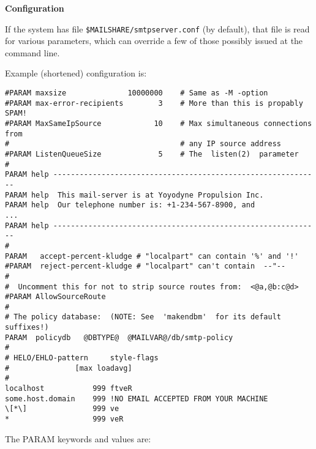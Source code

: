 {\bf Configuration}

If the system has file  {\tt \$MAILSHARE/smtpserver.conf} (by default),
that file is read for various parameters, which can override a few
of those possibly issued at the command line.

Example (shortened) configuration is:

\begin{tscreen}
\begin{verbatim}
#PARAM maxsize              10000000    # Same as -M -option
#PARAM max-error-recipients        3    # More than this is propably SPAM!
#PARAM MaxSameIpSource            10    # Max simultaneous connections from
#                                       # any IP source address
#PARAM ListenQueueSize             5    # The  listen(2)  parameter
#
PARAM help -------------------------------------------------------------
PARAM help  This mail-server is at Yoyodyne Propulsion Inc.
PARAM help  Our telephone number is: +1-234-567-8900, and
...
PARAM help -------------------------------------------------------------
#
PARAM   accept-percent-kludge # "localpart" can contain '%' and '!'
#PARAM  reject-percent-kludge # "localpart" can't contain  --"--
#
#  Uncomment this for not to strip source routes from:  <@a,@b:c@d>
#PARAM AllowSourceRoute
#
# The policy database:  (NOTE: See  'makendbm'  for its default suffixes!)
PARAM  policydb   @DBTYPE@  @MAILVAR@/db/smtp-policy
#
# HELO/EHLO-pattern     style-flags
#               [max loadavg]
#
localhost           999 ftveR
some.host.domain    999 !NO EMAIL ACCEPTED FROM YOUR MACHINE
\[*\]               999 ve
*                   999 veR
\end{verbatim}
\end{tscreen}




The PARAM keywords and values are:

